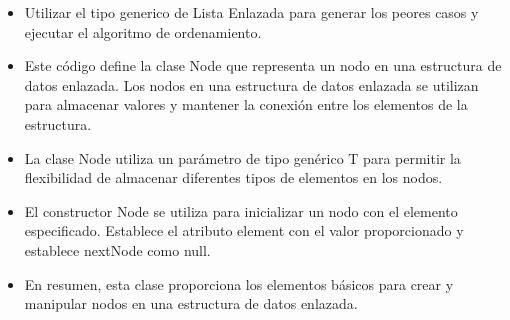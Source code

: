 \documentclass{article}
\begin{document}
	\begin{itemize}
		\item Utilizar el tipo generico de Lista Enlazada para generar los peores casos y ejecutar el	algoritmo de ordenamiento.
	\end{itemize}
	
	
	
	\begin{itemize}
		\item Este código define la clase Node que representa un nodo en una estructura de datos enlazada. Los nodos en una estructura de datos enlazada se utilizan para almacenar valores y mantener la conexión entre los elementos de la estructura.
		\item La clase Node utiliza un parámetro de tipo genérico T para permitir la flexibilidad de almacenar diferentes tipos de elementos en los nodos.
		\item El constructor Node se utiliza para inicializar un nodo con el elemento especificado. Establece el atributo element con el valor proporcionado y establece nextNode como null.
		\item En resumen, esta clase proporciona los elementos básicos para crear y manipular nodos en una estructura de datos enlazada.
	\end{itemize}
	
	
	
\end{document}
